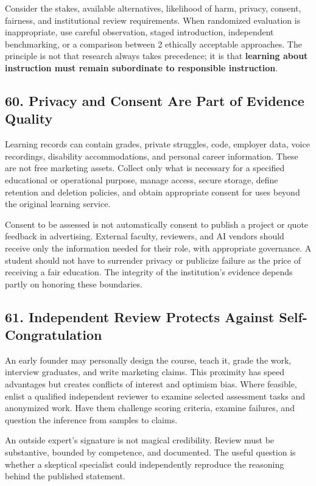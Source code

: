 Consider the stakes, available alternatives, likelihood of harm, privacy, consent, fairness, and institutional review requirements. When randomized evaluation is inappropriate, use careful observation, staged introduction, independent benchmarking, or a comparison between 2 ethically acceptable approaches. The principle is not that research always takes precedence; it is that \textbf{learning about instruction must remain subordinate to responsible instruction}.

\subsection*{60. Privacy and Consent Are Part of Evidence Quality}

Learning records can contain grades, private struggles, code, employer data, voice recordings, disability accommodations, and personal career information. These are not free marketing assets. Collect only what is necessary for a specified educational or operational purpose, manage access, secure storage, define retention and deletion policies, and obtain appropriate consent for uses beyond the original learning service.

Consent to be assessed is not automatically consent to publish a project or quote feedback in advertising. External faculty, reviewers, and AI vendors should receive only the information needed for their role, with appropriate governance. A student should not have to surrender privacy or publicize failure as the price of receiving a fair education. The integrity of the institution's evidence depends partly on honoring these boundaries.

\subsection*{61. Independent Review Protects Against Self-Congratulation}

An early founder may personally design the course, teach it, grade the work, interview graduates, and write marketing claims. This proximity has speed advantages but creates conflicts of interest and optimism bias. Where feasible, enlist a qualified independent reviewer to examine selected assessment tasks and anonymized work. Have them challenge scoring criteria, examine failures, and question the inference from samples to claims.

An outside expert's signature is not magical credibility. Review must be substantive, bounded by competence, and documented. The useful question is whether a skeptical specialist could independently reproduce the reasoning behind the published statement.

